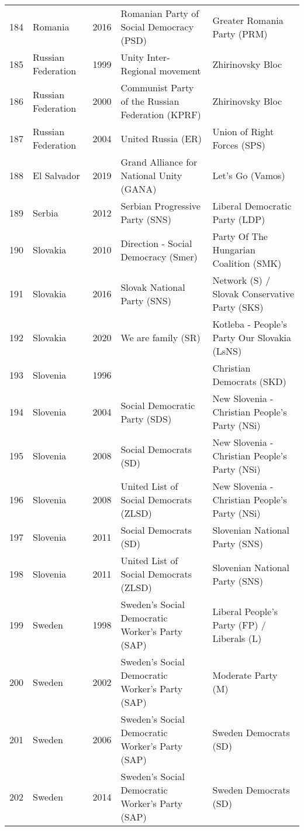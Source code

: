 \documentclass[12pt]{article}
\begin{document}
\begin{table}[ht]
\begin{footnotesize}
\begin{tabular}{rllll}
  184 & Romania & 2016 &   Romanian Party of Social Democracy (PSD) &   Greater Romania Party (PRM) \\ 
  185 & Russian Federation & 1999 &   Unity Inter-Regional movement &   Zhirinovsky Bloc \\ 
  186 & Russian Federation & 2000 &   Communist Party of the Russian Federation (KPRF) &   Zhirinovsky Bloc \\ 
  187 & Russian Federation & 2004 &   United Russia (ER) &   Union of Right Forces (SPS) \\ 
  188 & El Salvador & 2019 &   Grand Alliance for National Unity (GANA) &   Let's Go (Vamos) \\ 
  189 & Serbia & 2012 &   Serbian Progressive Party (SNS) &   Liberal Democratic Party (LDP) \\ 
  190 & Slovakia & 2010 &   Direction - Social Democracy (Smer) &   Party Of The Hungarian Coalition (SMK) \\ 
  191 & Slovakia & 2016 &   Slovak National Party (SNS) &   Network (S) / Slovak Conservative Party (SKS) \\ 
  192 & Slovakia & 2020 &   We are family (SR) &   Kotleba - People's Party Our Slovakia (LsNS) \\ 
  193 & Slovenia & 1996 &  &   Christian Democrats (SKD) \\ 
  194 & Slovenia & 2004 &   Social Democratic Party (SDS) &   New Slovenia - Christian People's Party (NSi) \\ 
  195 & Slovenia & 2008 &   Social Democrats (SD)  &   New Slovenia - Christian People's Party (NSi) \\ 
  196 & Slovenia & 2008 &   United List of Social Democrats (ZLSD) &   New Slovenia - Christian People's Party (NSi) \\ 
  197 & Slovenia & 2011 &   Social Democrats (SD)  &   Slovenian National Party (SNS) \\ 
  198 & Slovenia & 2011 &   United List of Social Democrats (ZLSD) &   Slovenian National Party (SNS) \\ 
  199 & Sweden & 1998 &   Sweden's Social Democratic Worker's Party (SAP) &   Liberal People's Party (FP) / Liberals (L) \\ 
  200 & Sweden & 2002 &   Sweden's Social Democratic Worker's Party (SAP) &   Moderate Party (M) \\ 
  201 & Sweden & 2006 &   Sweden's Social Democratic Worker's Party (SAP) &   Sweden Democrats (SD) \\ 
  202 & Sweden & 2014 &   Sweden's Social Democratic Worker's Party (SAP) &   Sweden Democrats (SD) \\ 

\end{tabular}
\end{footnotesize}
\end{table}
\end{document}
